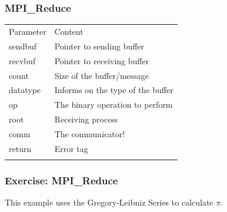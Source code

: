 \subsubsection{MPI\_Reduce}\label{mpiux5freduce}

\begin{Shaded}
\begin{Highlighting}[]
     
                
\end{Highlighting}
\end{Shaded}

\begin{longtable}[c]{@{}ll@{}}
\toprule\addlinespace
Parameter & Content
\\\addlinespace
\midrule\endhead
sendbuf & Pointer to sending buffer
\\\addlinespace
recvbuf & Pointer to receiving buffer
\\\addlinespace
count & Size of the buffer/message
\\\addlinespace
datatype & Informs on the type of the buffer
\\\addlinespace
op & The binary operation to perform
\\\addlinespace
root & Receiving process
\\\addlinespace
comm & The communicator!
\\\addlinespace
return & Error tag
\\\addlinespace
\bottomrule
\end{longtable}

\subsubsection{Exercise: MPI\_Reduce}\label{exercise-mpiux5freduce}

This example uses the Gregory-Leibniz Series to calculate $\pi$.

\begin{Shaded}
\begin{Highlighting}[]

        \NormalTok{;}
        \NormalTok{+ }\NormalTok{;}
       \NormalTok{;}
       \NormalTok{;}
       \NormalTok{(} 
      \NormalTok{\{}
        \NormalTok{;}
      \NormalTok{\}}
\end{Highlighting}
\end{Shaded}

